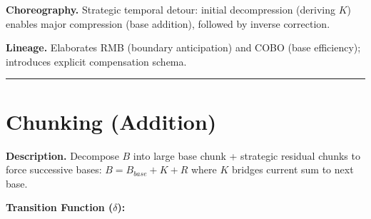 \documentclass[
]{article}
\begin{document}
\textbf{Choreography.} Strategic temporal detour: initial decompression
(deriving \(K\)) enables major compression (base addition), followed by
inverse correction.

\textbf{Lineage.} Elaborates RMB (boundary anticipation) and COBO (base
efficiency); introduces explicit compensation schema.

\begin{center}\rule{0.5\linewidth}{0.5pt}\end{center}

\section{Chunking (Addition)}\label{chunking-addition}

\textbf{Description.} Decompose \(B\) into large base chunk + strategic
residual chunks to force successive bases: \(B = B_{base} + K + R\)
where \(K\) bridges current sum to next base.

\textbf{Transition Function (\(\delta\)):}
\end{document}
